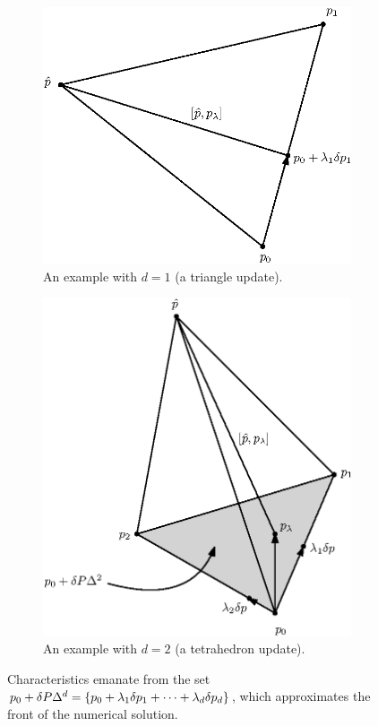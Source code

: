 \documentclass[eikonal.tex]{subfiles}
\begin{document}
\begin{figure}
  \centering
  \begin{subfigure}{.5\textwidth}
    \centering
    \includegraphics[width=\linewidth]{tri-diagram.eps}
    \caption{An example with $d = 1$ (a triangle
      update).}\label{fig:tri-diagram}
  \end{subfigure}%
  \begin{subfigure}{.5\textwidth}
    \centering
    \includegraphics[width=\linewidth]{simplex-diagram.eps}
    \caption{An example with $d = 2$ (a tetrahedron
      update).}\label{fig:tetra-diagram}
  \end{subfigure}
  \caption{Characteristics emanate from the set
    $p_0 + \delta P \Delta^d = \left\{p_0 + \lambda_1 \delta p_1 +
      \cdots + \lambda_d \delta p_d\right\}$, which approximates the front of
    the numerical solution.}\label{fig:simplex-diagrams}
\end{figure}
\end{document}
